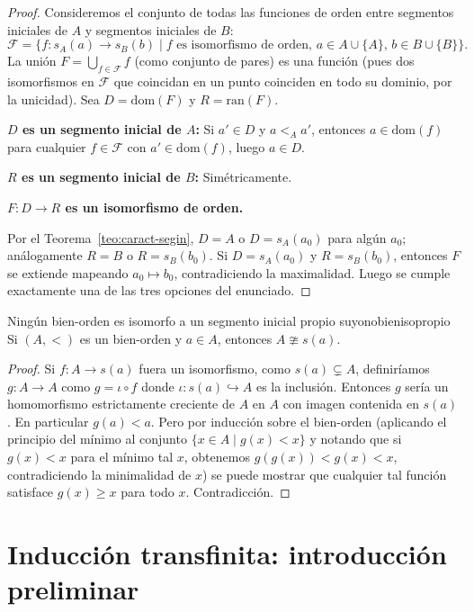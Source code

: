 \begin{proof}
Consideremos el conjunto de todas las funciones de orden entre segmentos iniciales de $A$ y segmentos iniciales de $B$:
\[
  \mathcal{F} = \{f: s_A(a) \to s_B(b) \mid f \text{ es isomorfismo de orden, } a \in A \cup \{A\},\, b \in B \cup \{B\}\}.
\]
La unión $F = \bigcup_{f \in \mathcal{F}} f$ (como conjunto de pares) es una función (pues dos isomorfismos en $\mathcal{F}$ que coincidan en un punto coinciden en todo su dominio, por la unicidad). Sea $D = \mathrm{dom}(F)$ y $R = \mathrm{ran}(F)$.

\textbf{$D$ es un segmento inicial de $A$:} Si $a' \in D$ y $a <_A a'$, entonces $a \in \mathrm{dom}(f)$ para cualquier $f \in \mathcal{F}$ con $a' \in \mathrm{dom}(f)$, luego $a \in D$.

\textbf{$R$ es un segmento inicial de $B$:} Simétricamente.

\textbf{$F: D \to R$ es un isomorfismo de orden.}

Por el Teorema~\ref{teo:caract-segin}, $D = A$ o $D = s_A(a_0)$ para algún $a_0$; análogamente $R = B$ o $R = s_B(b_0)$. Si $D = s_A(a_0)$ y $R = s_B(b_0)$, entonces $F$ se extiende mapeando $a_0 \mapsto b_0$, contradiciendo la maximalidad. Luego se cumple exactamente una de las tres opciones del enunciado.
\end{proof}

\begin{corolario}{Ningún bien-orden es isomorfo a un segmento inicial propio suyo}{nobienisopropio}
Si $(A, <)$ es un bien-orden y $a \in A$, entonces $A \ncong s(a)$.
\end{corolario}

\begin{proof}
Si $f: A \to s(a)$ fuera un isomorfismo, como $s(a) \subsetneq A$, definiríamos $g: A \to A$ como $g = \iota \circ f$ donde $\iota: s(a) \hookrightarrow A$ es la inclusión. Entonces $g$ sería un homomorfismo estrictamente creciente de $A$ en $A$ con imagen contenida en $s(a)$. En particular $g(a) < a$. Pero por inducción sobre el bien-orden (aplicando el principio del mínimo al conjunto $\{x \in A \mid g(x) < x\}$ y notando que si $g(x) < x$ para el mínimo tal $x$, obtenemos $g(g(x)) < g(x) < x$, contradiciendo la minimalidad de $x$) se puede mostrar que cualquier tal función satisface $g(x) \geq x$ para todo $x$. Contradicción.
\end{proof}

\section{Inducción transfinita: introducción preliminar}

